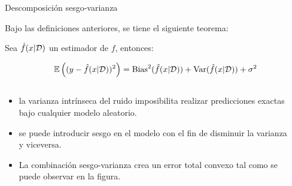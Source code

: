 \documentclass[9pt]{beamer}
\begin{document}
\begin{frame}{Descomposición sesgo-varianza}
	
	Bajo las definiciones anteriores, se tiene el siguiente teorema:

\begin{theorem} Sea $\hat{f}(x|{\mathcal D})$ un estimador de $f$, entonces:

\begin{equation*}
	\operatorname{\mathbb{E}}\left((y-\hat{f}(x|{\mathcal D}))^2\right) = \text{Bias}^2(\hat{f}(x|{\mathcal D})) + \text{Var}(\hat{f}(x|{\mathcal D})) + \sigma^2
\end{equation*}
	
\end{theorem}\pause

\begin{columns}

\begin{column}{0.6\textwidth}

\begin{itemize}
	\item la varianza intrínseca del ruido imposibilita realizar predicciones exactas bajo cualquier modelo aleatorio. \pause
	\item se puede introducir sesgo en el modelo con el fin de disminuir la varianza y viceversa.\pause
	\item La combinación sesgo-varianza crea un error total convexo tal como se puede observar en la figura.
\end{itemize}

\end{column}

\begin{column}{0.4\textwidth}


\end{column}
\end{columns}
\end{frame}
\end{document}
